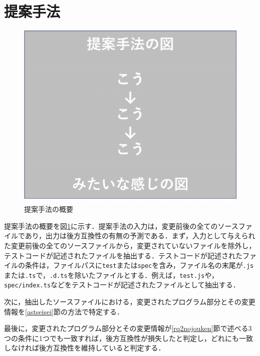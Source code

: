 \documentclass[11pt,dvipdfmx]{jreport}
\begin{document}
\section{提案手法}\label{rq2:teian}

\begin{figure}[t]
  \label{fig:rq2.syuhou}
  \centering
  \includegraphics[width=1.0\linewidth]{fig/teiannshuhou.pdf}
  \caption{提案手法の概要}
\end{figure}

提案手法の概要を図\ref{fig:rq2.syuhou}に示す．提案手法の入力は，変更前後の全てのソースファイルであり，出力は後方互換性の有無の予測である．まず，入力として与えられた変更前後の全てのソースファイルから，変更されていないファイルを除外し，テストコードが記述されたファイルを抽出する．テストコードが記述されたファイルの条件は，ファイルパスに{\verb|test|}または{\verb|spec|}を含み，ファイル名の末尾が{\verb|.js|}または{\verb|.ts|}で，{\verb|.d.ts|}を除いたファイルとする．例えば，{\verb|test.js|}や，{\verb|spec/index.ts|}などをテストコードが記述されたファイルとして抽出する．

次に，抽出したソースファイルにおける，変更されたプログラム部分とその変更情報を\ref{astseisei}節の方法で特定する．

最後に，変更されたプログラム部分とその変更情報が\ref{rq2nojouken}節で述べる3つの条件に1つでも一致すれば，後方互換性が損失したと判定し，どれにも一致しなければ後方互換性を維持していると判定する．
\end{document}
